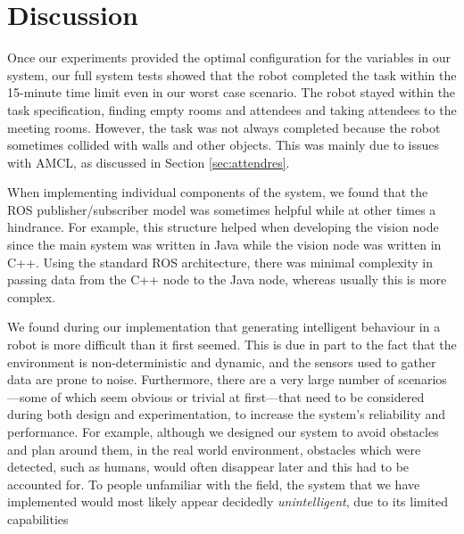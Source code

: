 \documentclass[conference]{IEEEtran}
\begin{document}
\section{Discussion}
Once our experiments provided the optimal configuration for the variables in our system, our full system tests showed that the robot completed the task within the 15-minute time limit even in our worst case scenario. The robot stayed within the task specification, finding empty rooms and attendees and taking attendees to the meeting rooms. However, the task was not always completed because the robot sometimes collided with walls and other objects. This was mainly due to issues with AMCL, as discussed in Section \ref{sec:attendres}.

When implementing individual components of the system, we found that the ROS publisher/subscriber model was sometimes helpful while at other times a hindrance. For example, this structure helped when developing the vision node since the main system was written in Java while the vision node was written in C++. Using the standard ROS architecture, there was minimal complexity in passing data from the C++ node to the Java node, whereas usually this is more complex.

We found during our implementation that generating intelligent behaviour in a robot is more difficult than it first seemed. This is due in part to the fact that the environment is non-deterministic and dynamic, and the sensors used to gather data are prone to noise. Furthermore, there are a very large number of scenarios---some of which seem obvious or trivial at first---that need to be considered during both design and experimentation, to increase the system's reliability and performance. For example, although we designed our system to avoid obstacles and plan around them, in the real world environment, obstacles which were detected, such as humans, would often disappear later and this had to be accounted for. To people unfamiliar with the field, the system that we have implemented would most likely appear decidedly \emph{unintelligent}, due to its limited capabilities
\end{document}
